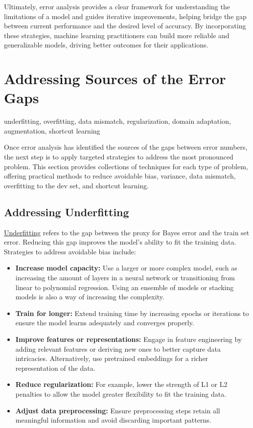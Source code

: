 \documentclass[12pt,openany]{book}
\begin{document}
Ultimately, error analysis provides a clear framework for understanding the limitations of a model and guides iterative improvements, helping bridge the gap between current performance and the desired level of accuracy. By incorporating these strategies, machine learning practitioners can build more reliable and generalizable models, driving better outcomes for their applications.



\section{Addressing Sources of the Error Gaps} \label{sec:addressing_sources_error_gaps}

\begin{keywordsbox}
underfitting, overfitting, data mismatch, regularization, domain adaptation, augmentation, shortcut learning
\end{keywordsbox}

Once error analysis has identified the sources of the gaps between error numbers, the next step is to apply targeted strategies to address the most pronounced problem. This section provides collections of techniques for each type of problem, offering practical methods to reduce avoidable bias, variance, data mismatch, overfitting to the dev set, and shortcut learning.

\subsection{Addressing Underfitting}

\hyperref[subsec:underfitting]{Underfitting} refers to the gap between the proxy for Bayes error and the train set error. Reducing this gap improves the model’s ability to fit the training data. Strategies to address avoidable bias include:

\begin{itemize}
    \item \textbf{Increase model capacity:} Use a larger or more complex model, such as increasing the amount of layers in a neural network or transitioning from linear to polynomial regression. Using an ensemble of models or stacking models is also a way of increasing the complexity.
    \item \textbf{Train for longer:} Extend training time by increasing epochs or iterations to ensure the model learns adequately and converges properly.
    \item \textbf{Improve features or representations:} Engage in feature engineering by adding relevant features or deriving new ones to better capture data intricacies. Alternatively, use pretrained embeddings for a richer representation of the data.
    \item \textbf{Reduce regularization:} For example, lower the strength of L1 or L2 penalties to allow the model greater flexibility to fit the training data.
    \item \textbf{Adjust data preprocessing:} Ensure preprocessing steps retain all meaningful information and avoid discarding important patterns.
\end{itemize}
\end{document}
